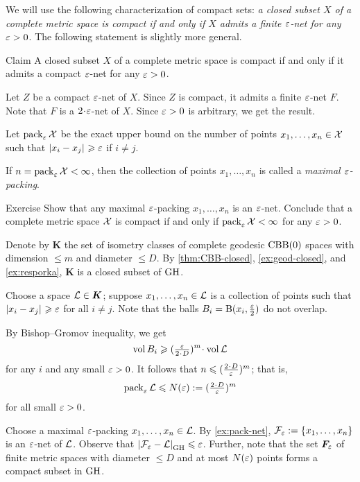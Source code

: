 We will use the following characterization of compact sets: \textit{a closed subset $X$ of a complete metric space is compact if and only if $X$ admits a finite $\varepsilon$-net for any $\varepsilon>0$}.
The following statement is slightly more general.

\begin{thm}{Claim}\label{clm:compact-net}
A closed subset $X$ of a complete metric space is compact if and only if it admits a compact $\varepsilon$-net for any $\varepsilon>0$.
\end{thm}

Let $Z$ be a compact $\varepsilon$-net of $X$.
Since $Z$ is compact, it admits a finite $\varepsilon$-net $F$.
Note that $F$ is a $2\cdot\eps$-net of $X$.
Since $\varepsilon>0$ is arbitrary, we get the result.
\qeds

Let $\operatorname{\rm pack}\nolimits_\varepsilon\mathcal{X}$ be the exact upper bound on the number of points $x_1,\z\dots,x_n\in \spc{X}$ such that $\dist{x_i}{x_j}{}\ge\eps$ if $i\ne j$.

If $n=\operatorname{\rm pack}\nolimits_\varepsilon\mathcal{X}<\infty$, then
the collection of points $x_1,\dots,x_n$ is called a \emph{maximal $\varepsilon$-packing}.

\begin{thm}{Exercise}\label{ex:pack-net}
Show that any maximal $\varepsilon$-packing $x_1,\dots,x_n$ is an $\varepsilon$-net.
Conclude that a complete metric space $\mathcal{X}$ is compact if and only if $\pack_\eps\spc{X}\z<\infty$ for any $\varepsilon>0$.
\end{thm}


Denote by $\bm{K}$ the set of isometry classes of  complete geodesic $\mathrm{CBB}(0)$ spaces  with dimension $\le m$ and diameter $\le D$.
By \ref{thm:CBB-closed}, \ref{ex:geod-closed}, and \ref{ex:resporka}, $\bm{K}$ is a closed subset of $\operatorname{\rm GH}\nolimits$.

Choose a space $\mathcal{L}\in \bm{K}$;
suppose $x_1,\dots,x_n\in \mathcal{L}$ is a collection of points such that $\dist{x_i}{x_j}{}\ge \eps$ for all $i\ne j$.
Note that the balls $B_i=\mathrm{B}{}(x_i,\tfrac{\varepsilon}2)$ do not overlap.

By Bishop--Gromov inequality, we get 
\[\vol B_i\ge (\tfrac\eps{2\cdot D})^m\cdot\vol \spc{L}\]
for any $i$ and any small $\varepsilon>0$.
It follows that $n\le (\tfrac{2\cdot D}\eps)^m$;
that is, 
\[\pack_\eps\spc{L}\le  N(\eps)\df(\tfrac{2\cdot D}\eps)^m\]
for all small $\varepsilon>0$.

Choose a maximal $\varepsilon$-packing $x_1,\z\dots,x_n\in \spc{L}$.
By \ref{ex:pack-net}, $\spc{F}_\eps\z\df\{x_1,\z\dots,x_n\}$ is an $\varepsilon$-net of $\mathcal{L}$.
Observe that $\dist{\spc{F}_\eps}{\spc{L}}{\GH}\le \eps$.
Further, note that the set $\bm{F}_\varepsilon$ of finite metric spaces with diameter $\le D$ and at most $N(\varepsilon)$ points forms a compact subset in $\operatorname{\rm GH}\nolimits$.

